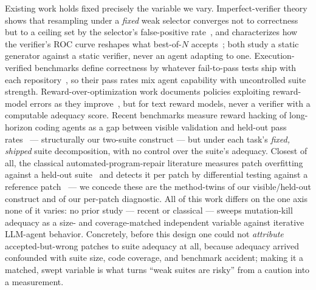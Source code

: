 \documentclass[conference]{IEEEtran}
\begin{document}
Existing work holds fixed precisely the variable we vary.
Imperfect-verifier theory shows that resampling under a \emph{fixed} weak
selector converges not to correctness but to a ceiling set by the
selector's false-positive rate~\cite{ResamplingLimits_j8H84v6AZ1}, and
characterizes how the verifier's ROC curve reshapes what best-of-$N$
accepts~\cite{ROCnReroll_3Gy5mmyuxn}; both study a static generator
against a static verifier, never an agent adapting to one.
Execution-verified benchmarks define correctness by whatever fail-to-pass
tests ship with each repository~\cite{SWEbench_VTF8yNQM66}, so their pass
rates mix agent capability with uncontrolled suite strength.
Reward-over-optimization work documents policies exploiting reward-model
errors as they improve~\cite{ChasingTail_pBjy4ek2QV,acl_pang_etal_2023_reward},
but for text reward models, never a verifier with a computable adequacy
score. Recent benchmarks measure reward hacking of long-horizon coding
agents as a gap between visible validation and held-out pass
rates~\cite{SpecBench_2605_21384,RHB_2605_02964} --- structurally our
two-suite construct --- but under each task's \emph{fixed, shipped} suite
decomposition, with no control over the suite's adequacy. Closest of all,
the classical automated-program-repair literature measures patch
overfitting against a held-out suite~\cite{Smith2015Overfitting,
Qi2015PatchPlausibility} and detects it per patch by differential testing
against a reference patch~\cite{XinReiss2017DiffTGen,Xiong2018PatchSim}
--- we concede these are the method-twins of our visible/held-out
construct and of our per-patch diagnostic. All of this work differs on the
one axis none of it varies: no prior study --- recent or classical ---
sweeps mutation-kill adequacy as a size- and coverage-matched independent
variable against iterative LLM-agent behavior. Concretely, before this
design one could not \emph{attribute} accepted-but-wrong patches to suite
adequacy at all, because adequacy arrived confounded with suite size, code
coverage, and benchmark accident; making it a matched, swept variable is
what turns ``weak suites are risky'' from a caution into a measurement.
\end{document}
